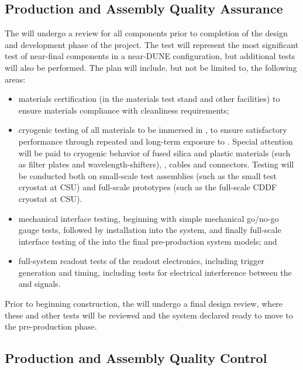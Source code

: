 \subsection{Production and Assembly Quality Assurance}
\label{sec:fdsp-pd-prodqa}

The  will undergo a  review for all components prior to completion of the design and development phase of the project.  The  test will represent the most significant test of near-final  components in a near-DUNE configuration, but additional tests will also be performed.  The  plan will include, but not be limited to, the following areas:

\begin{itemize}
\item materials certification (in the  materials test stand and other facilities) to ensure materials compliance with cleanliness requirements;
\item cryogenic testing of all materials to be immersed in \lar, to ensure satisfactory performance through repeated and long-term exposure to \lar{}.  Special attention will be paid to cryogenic behavior of fused silica and plastic materials (such as filter plates and wavelength-shifters), , cables and connectors.  Testing will be conducted both on small-scale test assemblies (such as the small test cryostat at CSU) and full-scale prototypes (such as the full-scale CDDF cryostat at CSU). 
\item mechanical interface testing, beginning with simple mechanical go/no-go gauge tests, followed by installation into the  system, and finally full-scale interface testing of the  into the final pre-production  system models; and
\item full-system readout tests of the  readout electronics, including trigger generation and timing, including tests for electrical interference between the  and  signals.
\end{itemize}


Prior to beginning construction, the  will undergo a final design review, where these and other  tests will be reviewed and the system declared ready to move to the pre-production phase.


\subsection{Production and Assembly Quality Control}
\label{sec:fdsp-pd-prodqc}

